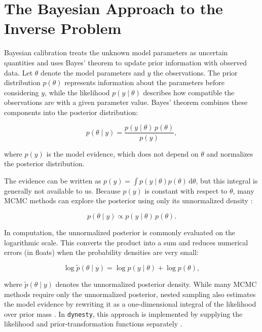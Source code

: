 \section{The Bayesian Approach to the Inverse Problem}
\label{sec:bayesian-approach}

Bayesian calibration treats the unknown model parameters as uncertain quantities and uses Bayes' theorem to update prior information with observed data. Let $\theta$ denote the model parameters and $y$ the observations. The prior distribution $p(\theta)$ represents information about the parameters before considering $y$, while the likelihood $p(y \mid \theta)$ describes how compatible the observations are with a given parameter value. Bayes' theorem combines these components into the posterior distribution:

\begin{equation}
    p(\theta \mid y)
    =
    \frac{p(y \mid \theta)\,p(\theta)}{p(y)},
    \label{eq:bayes-theorem}
\end{equation}

where $p(y)$ is the model evidence, which does not depend on $\theta$ and normalizes the posterior distribution.

The evidence can be written as $p(y)=\int p(y\mid\theta)p(\theta)\,\mathrm{d}\theta$, but this integral is generally not available to us. Because $p(y)$ is constant with respect to $\theta$, many MCMC methods can explore the posterior using only its unnormalized density \autocite{Kennedy2001,Albert2025}:

\begin{equation}
    p(\theta \mid y)
    \propto
    p(y \mid \theta)\,p(\theta).
    \label{eq:unnormalized-posterior}
\end{equation}

In computation, the unnormalized posterior is commonly evaluated on the logarithmic scale. This converts the product into a sum and reduces numerical errors (in floats) when the probability densities are very small:

\begin{equation}
    \log \widetilde{p}(\theta \mid y)
    =
    \log p(y \mid \theta)
    +
    \log p(\theta),
    \label{eq:log-posterior}
\end{equation}

where $\widetilde{p}(\theta \mid y)$ denotes the unnormalized posterior density. While many MCMC methods require only the unnormalized posterior, nested sampling also estimates the model evidence by rewriting it as a one-dimensional integral of the likelihood over prior mass \autocite{Skilling2006}. In \texttt{dynesty}, this approach is implemented by supplying the likelihood and prior-transformation functions separately \autocite{Speagle2020}.

